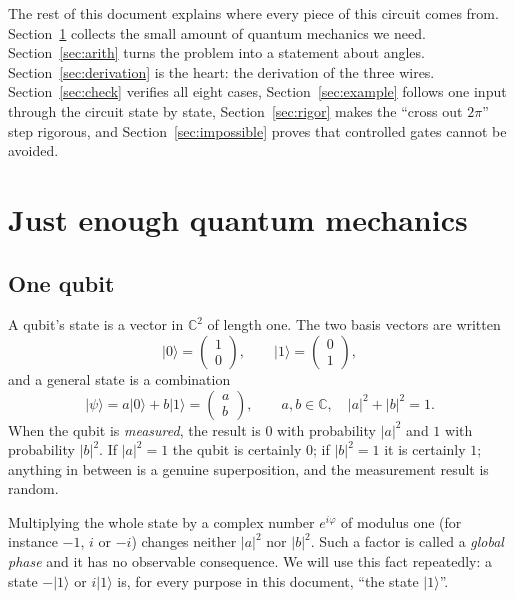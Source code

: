 \documentclass[11pt,a4paper]{article}
\newcommand{\ket}[1]{\lvert #1 \rangle}
\newcommand{\C}{\mathbb{C}}
\theoremstyle{plain}
\theoremstyle{definition}
\theoremstyle{remark}
\begin{document}
The rest of this document explains where every piece of this circuit comes from.
Section~\ref{sec:qm} collects the small amount of quantum mechanics we need.
Section~\ref{sec:arith} turns the problem into a statement about angles.
Section~\ref{sec:derivation} is the heart: the derivation of the three wires.
Section~\ref{sec:check} verifies all eight cases, Section~\ref{sec:example} follows one input
through the circuit state by state, Section~\ref{sec:rigor} makes the ``cross out $2\pi$'' step
rigorous, and Section~\ref{sec:impossible} proves that controlled gates cannot be avoided.

\section{Just enough quantum mechanics}\label{sec:qm}

\subsection{One qubit}

A qubit's state is a vector in $\C^2$ of length one. The two basis vectors are written
\[
\ket{0} = \begin{pmatrix}1\\0\end{pmatrix}, \qquad
\ket{1} = \begin{pmatrix}0\\1\end{pmatrix},
\]
and a general state is a combination
\[
\ket{\psi} = a\ket{0} + b\ket{1} = \begin{pmatrix}a\\b\end{pmatrix},
\qquad a,b\in\C,\quad |a|^2+|b|^2 = 1.
\]
When the qubit is \emph{measured}, the result is $0$ with probability $|a|^2$ and $1$ with
probability $|b|^2$. If $|a|^2 = 1$ the qubit is certainly $0$; if $|b|^2=1$ it is certainly
$1$; anything in between is a genuine superposition, and the measurement result is random.

\begin{keybox}
Multiplying the whole state by a complex number $e^{i\varphi}$ of modulus one
(for instance $-1$, $i$ or $-i$) changes neither $|a|^2$ nor $|b|^2$. Such a factor is called a
\emph{global phase} and it has no observable consequence. We will use this fact repeatedly: a state
$-\ket{1}$ or $i\ket{1}$ is, for every purpose in this document, ``the state $\ket{1}$''.
\end{keybox}
\end{document}
